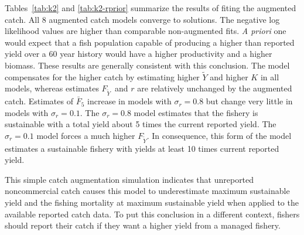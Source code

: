 \documentclass[12pt,letterpaper]{article}
\newcommand\MSY{\widetilde{Y}}
\newcommand\Fmsy{F_{\MSY}}
\begin{document}
Tables~\ref{tab:k2} and \ref{tab:k2-rprior} summarize the results of
fiting the augmented catch.
All 8 augmented catch models converge to solutions. The negative
log likelihood values are higher than comparable non-augmented fits.
{\it A priori} one would expect that a fish population capable
of producing a higher than reported yield over a 60 year history
would have a higher productivity and a higher biomass. These results
are generally consistent with this conclusion. 
The model compensates for the higher catch by estimating higher
$\MSY$ and higher $K$ in all models, 
whereas estimates $\Fmsy$\ and $r$ are relatively unchanged by the
augmented catch.
Estimates of $\bar{F}_5$ increase in models with $\sigma_r=0.8$ but
change very little in models with $\sigma_r=0.1$.
The $\sigma_r=0.8$ model estimates that the fishery is sustainable
with a total yield about 5 times the current reported yield.
The $\sigma_r=0.1$ model forces a much higher $\Fmsy$. In consequence,
this form of the model estimates a sustainable fishery with yields at
least 10 times current reported yield. 

This simple catch augmentation simulation indicates that unreported
noncommercial catch causes this model to underestimate maximum
sustainable yield and the fishing mortality at maximum sustainable
yield when applied to the available reported catch data. To put this
conclusion in a different context, fishers should report their catch
if they want a higher yield from a managed fishery.
\end{document}
